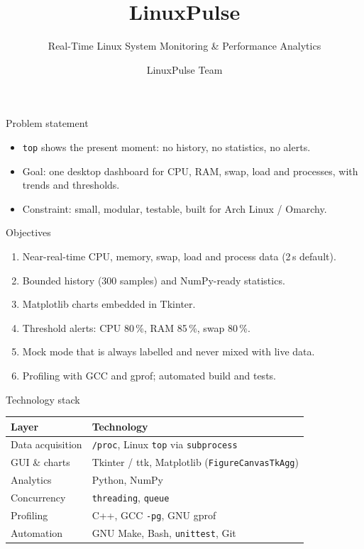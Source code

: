 \documentclass[aspectratio=169,10pt]{beamer}
\title{LinuxPulse}
\subtitle{Real-Time Linux System Monitoring \& Performance Analytics}
\author{LinuxPulse Team}
\institute{Indian Institute of Technology Dharwad}
\date{}
\begin{document}
\maketitle

\begin{frame}{Problem statement}
\begin{itemize}
  \item \texttt{top} shows the present moment: no history, no statistics, no alerts.
  \item Goal: one desktop dashboard for CPU, RAM, swap, load and processes, with trends and thresholds.
  \item Constraint: small, modular, testable, built for Arch Linux / Omarchy.
\end{itemize}
\end{frame}

\begin{frame}{Objectives}
\begin{enumerate}
  \item Near-real-time CPU, memory, swap, load and process data (2\,s default).
  \item Bounded history (300 samples) and NumPy-ready statistics.
  \item Matplotlib charts embedded in Tkinter.
  \item Threshold alerts: CPU 80\,\%, RAM 85\,\%, swap 80\,\%.
  \item Mock mode that is always labelled and never mixed with live data.
  \item Profiling with GCC and gprof; automated build and tests.
\end{enumerate}
\end{frame}

\begin{frame}{Technology stack}
\begin{tabular}{ll}
\toprule Layer & Technology \\ \midrule
Data acquisition & \texttt{/proc}, Linux \texttt{top} via \texttt{subprocess} \\
GUI \& charts & Tkinter / ttk, Matplotlib (\texttt{FigureCanvasTkAgg}) \\
Analytics & Python, NumPy \\
Concurrency & \texttt{threading}, \texttt{queue} \\
Profiling & C++, GCC \texttt{-pg}, GNU gprof \\
Automation & GNU Make, Bash, \texttt{unittest}, Git \\ \bottomrule
\end{tabular}
\end{frame}
\end{document}
